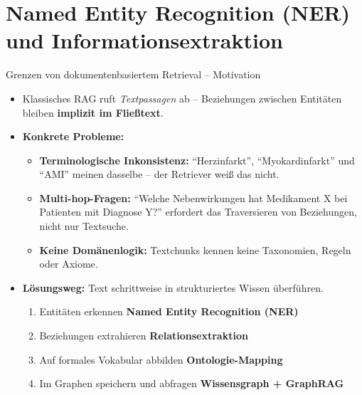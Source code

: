 \documentclass[aspectratio=1610, xcolor=dvipsnames, 9pt]{beamer}
\begin{document}
\section{Named Entity Recognition (NER) und Informationsextraktion}

\begin{frame}{Grenzen von dokumentenbasiertem Retrieval -- Motivation}
  \begin{itemize}
    \item Klassisches RAG ruft \emph{Textpassagen} ab -- Beziehungen zwischen Entitäten bleiben \textbf{implizit im Fließtext}.
    \item \textbf{Konkrete Probleme:}
      \begin{itemize}
        \item \textbf{Terminologische Inkonsistenz:} ``Herzinfarkt'', ``Myokardinfarkt'' und ``AMI'' meinen dasselbe -- der Retriever weiß das nicht.
        \item \textbf{Multi-hop-Fragen:} ``Welche Nebenwirkungen hat Medikament X bei Patienten mit Diagnose Y?'' erfordert das Traversieren von Beziehungen, nicht nur Textsuche.
        \item \textbf{Keine Domänenlogik:} Textchunks kennen keine Taxonomien, Regeln oder Axiome.
      \end{itemize}
    \vspace{0.2cm}
    \item \textbf{Lösungsweg:} Text schrittweise in strukturiertes Wissen überführen.
      \begin{enumerate}
        \item Entitäten erkennen \textrightarrow{} \textbf{Named Entity Recognition (NER)}
        \item Beziehungen extrahieren \textrightarrow{} \textbf{Relationsextraktion}
        \item Auf formales Vokabular abbilden \textrightarrow{} \textbf{Ontologie-Mapping}
        \item Im Graphen speichern und abfragen \textrightarrow{} \textbf{Wissensgraph + GraphRAG}
      \end{enumerate}
  \end{itemize}
\end{frame}
\end{document}
